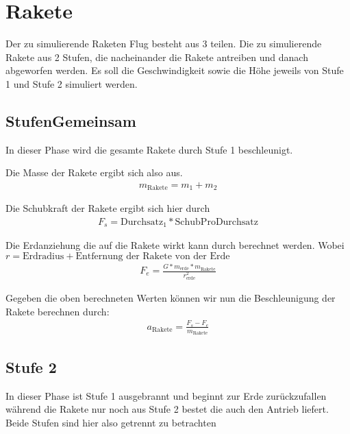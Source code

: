 \documentclass[10pt]{scrartcl}
\author{Oliver Steenbuck, Karolina Bernat}
\title{\titletext}
\date{12.12.2012}
\begin{document}
\maketitle
\setcounter{tocdepth}{3}
\tableofcontents
\listoffigures
\lstlistoflistings


\section{Rakete}
	Der zu simulierende Raketen Flug besteht aus 3 teilen. Die zu simulierende Rakete aus 2 Stufen, die nacheinander die Rakete antreiben und danach abgeworfen werden.
	Es soll die Geschwindigkeit sowie die Höhe jeweils von Stufe 1 und Stufe 2 simuliert werden.
	

	\subsection{StufenGemeinsam} \label{sec:stufenGemeinsam}
	In dieser Phase wird die gesamte Rakete durch Stufe 1 beschleunigt.
	
	Die Masse der Rakete ergibt sich also aus.
	\begin{align} 
	m_{\text{Rakete}} = m_1 + m_2
	\end{align}

	Die Schubkraft der Rakete ergibt sich hier durch
	\begin{align}
	F_s = \text{Durchsatz}_1 * \text{SchubProDurchsatz}
	\end{align}

	Die Erdanziehung die auf die Rakete wirkt kann durch berechnet werden. Wobei\\ $r = \text{Erdradius} + \text{Entfernung der Rakete von der Erde}$
	\begin{align}
	F_e = \frac{G * m_{\text{erde}} * m_{\text{Rakete}}}{r_{\text{erde}}^2}
	\end{align}
	
	Gegeben die oben berechneten Werten können wir nun die Beschleunigung der Rakete berechnen durch:
	\begin{align}
	a_{\text{Rakete}} = \frac{F_s - F_e}{m_{\text{Rakete}}}
	\end{align}
	
	\subsection{Stufe 2}
	In dieser Phase ist Stufe 1 ausgebrannt und beginnt zur Erde zurückzufallen während die Rakete nur noch aus Stufe 2 bestet die auch den Antrieb liefert. Beide Stufen sind hier also getrennt zu betrachten	
	
\end{document}
